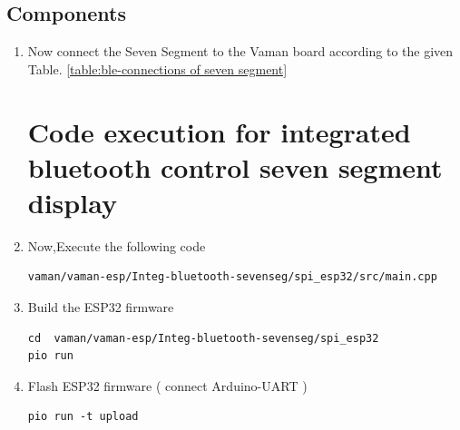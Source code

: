 \begin{abstract}\\
Through this manual, we will learn how to display Seven segment display using EOS S3 and ESP32 through SPI protocol. Here, ESP32 acts as master and EOS S3 acts as slave. The values that are entered in Dabble Terminal is received by ESP32 through Bluetooth and the values are transferred to EOS S3 through SPI. This is facilitated only when all 4 jumpers on the board are closed.
\end{abstract}
\subsection{Components}
\begin{enumerate}[label=\thesection.\arabic*.,ref=\thesection.\theenumi]

\begin{table}[!ht]
\centering

\caption{Components}
\label{table:ble-components of seven segment }
\end{table}
\item Now connect the Seven Segment to the Vaman board according to the given Table. \ref{table:ble-connections of seven segment}
\begin{table}[!ht]
\centering

\caption{Connections}
\label{table:ble-connections of seven segment}
\end{table}

\section{Code execution for integrated bluetooth control seven segment display}
\raggedright
\item Now,Execute the following code
\begin{lstlisting}
vaman/vaman-esp/Integ-bluetooth-sevenseg/spi_esp32/src/main.cpp
\end{lstlisting}

\item Build the ESP32 firmware
\begin{lstlisting}
cd  vaman/vaman-esp/Integ-bluetooth-sevenseg/spi_esp32
pio run
\end{lstlisting} 

\item Flash ESP32 firmware ( connect Arduino-UART  )
\begin{lstlisting}
pio run -t upload
\end{lstlisting} 


\end{enumerate}
